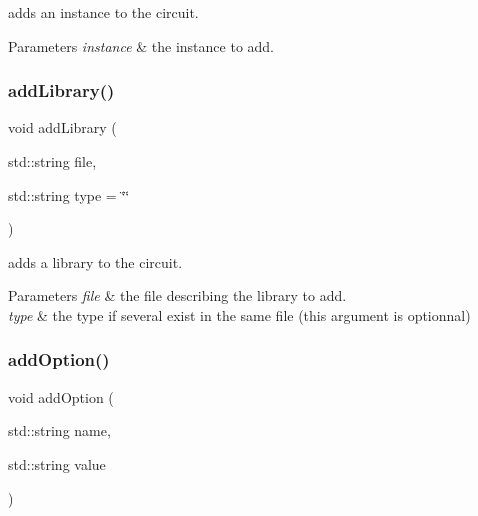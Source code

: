 adds an instance to the circuit. 


\begin{DoxyParams}{Parameters}
{\em instance} & the instance to add. \\
\hline
\end{DoxyParams}
\mbox{\label{class_s_p_i_c_e_1_1_circuit_a49939060cc1cb8e4bfaf003025032096}} 
\subsubsection{\texorpdfstring{add\+Library()}{addLibrary()}}
{\footnotesize\ttfamily void add\+Library (\begin{DoxyParamCaption}\item[{std\+::string}]{file,  }\item[{std\+::string}]{type = {\ttfamily \char`\"{}\char`\"{}} }\end{DoxyParamCaption})\hspace{0.3cm}{\ttfamily [inline]}}



adds a library to the circuit. 


\begin{DoxyParams}{Parameters}
{\em file} & the file describing the library to add. \\
\hline
{\em type} & the type if several exist in the same file (this argument is optionnal) \\
\hline
\end{DoxyParams}
\mbox{\label{class_s_p_i_c_e_1_1_circuit_a1abe34b48e2b6e1834a143fdef159cb9}} 
\subsubsection{\texorpdfstring{add\+Option()}{addOption()}}
{\footnotesize\ttfamily void add\+Option (\begin{DoxyParamCaption}\item[{std\+::string}]{name,  }\item[{std\+::string}]{value }\end{DoxyParamCaption})}



